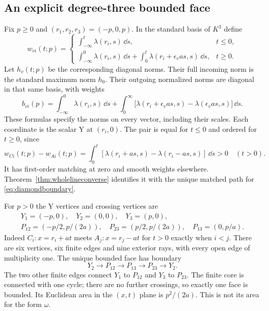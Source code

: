 \subsection{An explicit degree-three bounded face}
Fix $p\ge0$ and $(r_1,r_2,r_3)=(-p,0,p)$. In the standard
basis of $K^3$ define
\begin{equation}\label{eq:diamondweights}
 w_{vi}(t;p)=
 \begin{cases}
 \displaystyle\int_{-\infty}^t\lambda(r_i,s)\,\dd s,&t\le0,\\[4pt]
 \displaystyle\int_{-\infty}^0\lambda(r_i,s)\,\dd s
       +\int_0^t\lambda(r_i+\epsilon_va s,s)\,\dd s,&t\ge0.
 \end{cases}
\end{equation}
Let $h_v(t;p)$ be the corresponding diagonal norms.
Their full incoming norm is the standard maximum norm $h_0$.
Their outgoing normalized norms are diagonal in that same basis,
with weights
\begin{equation}\label{eq:diamondboundary}
 b_{vi}(p)=\int_{-\infty}^0\lambda(r_i,s)\,\dd s
   +\int_0^\infty
      \bigl[\lambda(r_i+\epsilon_va s,s)
                     -\lambda(\epsilon_va s,s)\bigr]\,\dd s.
\end{equation}
These formulas specify the norms on every vector, including their
scales. Each coordinate is the scalar Y at $(r_i,0)$.
The pair is equal for $t\le0$ and ordered for $t\ge0$, since
\[
 w_{Ci}(t;p)-w_{Ai}(t;p)
 =\int_0^t[\lambda(r_i+as,s)-\lambda(r_i-as,s)]\,\dd s>0
 \quad(t>0).
\]
It has first-order matching at zero and smooth weights elsewhere.
Theorem~\ref{thm:wholelineconverse} identifies it with the
unique matched path for \eqref{eq:diamondboundary}.

For $p>0$ the Y vertices and crossing vertices are
\begin{equation}\label{eq:diamondvertices}
 \begin{gathered}
 Y_1=(-p,0),\quad Y_2=(0,0),\quad Y_3=(p,0),\\
 P_{12}=(-p/2,p/(2a)),\quad
 P_{23}=(p/2,p/(2a)),\quad P_{13}=(0,p/a).
 \end{gathered}
\end{equation}
Indeed $C_i:x=r_i+at$ meets $A_j:x=r_j-at$ for $t>0$
exactly when $i<j$. There are six vertices, six finite edges
and nine exterior rays, with every open edge of multiplicity
one. The unique bounded face has boundary
\[
 Y_2\longrightarrow P_{12}\longrightarrow P_{13}
          \longrightarrow P_{23}\longrightarrow Y_2.
\]
The two other finite edges connect $Y_1$ to $P_{12}$ and
$Y_3$ to $P_{23}$. The finite core is connected with one cycle;
there are no further crossings, so exactly one face is bounded.
Its Euclidean area in the $(x,t)$ plane is $p^2/(2a)$.
This is not its area for the form $\omega$.

